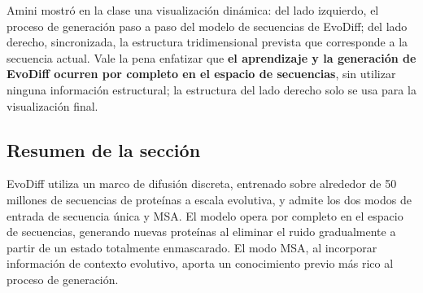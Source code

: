 Amini mostró en la clase una visualización dinámica: del lado izquierdo, el proceso de generación paso a paso del modelo de secuencias de EvoDiff; del lado derecho, sincronizada, la estructura tridimensional prevista que corresponde a la secuencia actual. Vale la pena enfatizar que \textbf{el aprendizaje y la generación de EvoDiff ocurren por completo en el espacio de secuencias}, sin utilizar ninguna información estructural; la estructura del lado derecho solo se usa para la visualización final.

\subsection{Resumen de la sección}

EvoDiff utiliza un marco de difusión discreta, entrenado sobre alrededor de 50 millones de secuencias de proteínas a escala evolutiva, y admite los dos modos de entrada de secuencia única y MSA. El modelo opera por completo en el espacio de secuencias, generando nuevas proteínas al eliminar el ruido gradualmente a partir de un estado totalmente enmascarado. El modo MSA, al incorporar información de contexto evolutivo, aporta un conocimiento previo más rico al proceso de generación.
